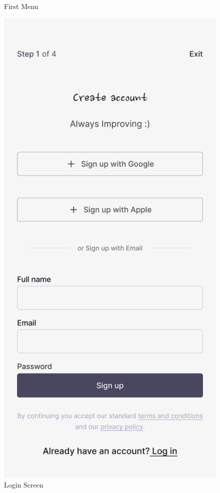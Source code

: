 \begin{figure}[htbp]
\begin{minipage}[b]{0.23\textwidth}
    \caption{First Menu}
    \label{fig:image1}
  \end{minipage}
  \hfill
  \begin{minipage}[b]{0.23\textwidth}
    \includegraphics[width=\textwidth]{Graphics/FinalDesigns/LoginScreen.png}
    \caption{Login Screen}
    \label{fig:image2}
  \end{minipage}
\end{figure}


\newpage


